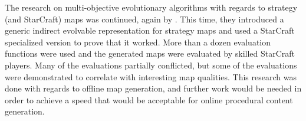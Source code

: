 The research on multi-objective evolutionary algorithms with regards to strategy (and StarCraft) maps was continued, again by \citeauthor{Togelius2013Controllable}\cite{Togelius2013Controllable}. This time, they introduced a generic indirect evolvable representation for strategy maps and used a StarCraft specialized version to prove that it worked. More than a dozen evaluation functions were used and the generated maps were evaluated by skilled StarCraft players. Many of the evaluations partially conflicted, but some of the evaluations were demonstrated to correlate with interesting map qualities. This research was done with regards to offline map generation, and further work would be needed in order to achieve a speed that would be acceptable for online procedural content generation.